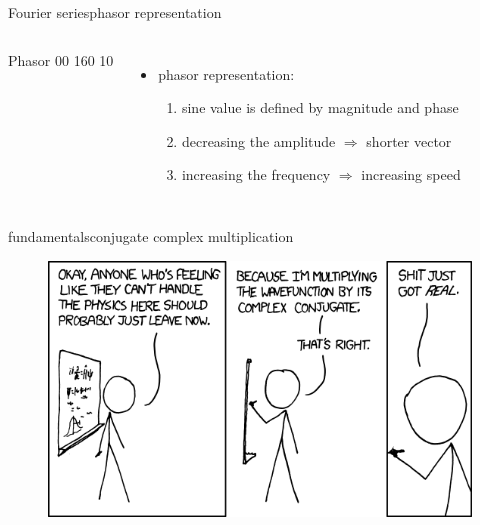         \begin{frame}{Fourier series}{phasor representation}
            \begin{columns}
                \vspace{-10mm}
                    {Phasor}
                    {00}
                    {160}
                    {10}
                \begin{itemize}
                    \item   phasor representation:
                        \begin{enumerate}
                            \item   sine value is defined by magnitude and phase
                            \item   decreasing the amplitude $\Rightarrow$ shorter vector
                            \item   increasing the frequency $\Rightarrow$ increasing speed
                        \end{enumerate}
                \end{itemize}
            \end{columns}
        \end{frame}
        
        \begin{frame}{fundamentals}{conjugate complex multiplication}
            \begin{figure}
                \includegraphics[scale=.45]{graph/xkcd_complex_conjugate}
            \end{figure}
            
        \end{frame}


